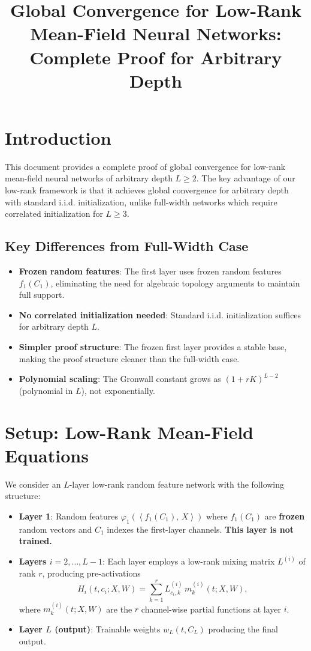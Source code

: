 \documentclass[11pt]{article}
\title{Global Convergence for Low-Rank Mean-Field Neural Networks:\\Complete Proof for Arbitrary Depth}
\author{ }
\date{}
\newcommand{\1}{\mathbbm{1}}
\newcommand{\ip}[2]{\left\langle #1,\,#2 \right\rangle}
\begin{document}
\maketitle

\tableofcontents

\section{Introduction}

This document provides a complete proof of global convergence for low-rank mean-field neural networks of arbitrary depth $L \ge 2$. The key advantage of our low-rank framework is that it achieves global convergence for arbitrary depth with standard i.i.d. initialization, unlike full-width networks which require correlated initialization for $L \ge 3$.

\subsection{Key Differences from Full-Width Case}

\begin{itemize}
\item \textbf{Frozen random features}: The first layer uses frozen random features $f_1(C_1)$, eliminating the need for algebraic topology arguments to maintain full support.
\item \textbf{No correlated initialization needed}: Standard i.i.d. initialization suffices for arbitrary depth $L$.
\item \textbf{Simpler proof structure}: The frozen first layer provides a stable base, making the proof structure cleaner than the full-width case.
\item \textbf{Polynomial scaling}: The Gronwall constant grows as $(1+rK)^{L-2}$ (polynomial in $L$), not exponentially.
\end{itemize}

\section{Setup: Low-Rank Mean-Field Equations}

We consider an $L$-layer low-rank random feature network with the following structure:

\begin{itemize}
\item \textbf{Layer 1}: Random features $\varphi_1(\ip{f_1(C_1)}{X})$ where $f_1(C_1)$ are \textbf{frozen} random vectors and $C_1$ indexes the first-layer channels. \textbf{This layer is not trained.}
\item \textbf{Layers $i = 2, \ldots, L-1$}: Each layer employs a low-rank mixing matrix $L^{(i)}$ of rank $r$, producing pre-activations
\[
H_i(t,c_i;X,W)=\sum_{k=1}^r L^{(i)}_{c_i,k}\,m_k^{(i)}(t;X,W),
\]
where $m_k^{(i)}(t;X,W)$ are the $r$ channel-wise partial functions at layer $i$.
\item \textbf{Layer $L$ (output)}: Trainable weights $w_L(t,C_L)$ producing the final output.
\end{itemize}
\end{document}
